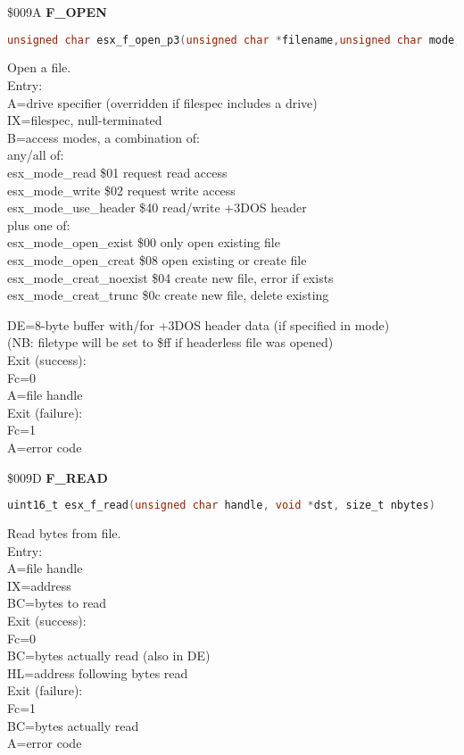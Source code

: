 \$009A \textbf{F\_OPEN}

\begin{lstlisting}[language=C]
unsigned char esx_f_open_p3(unsigned char *filename,unsigned char mode,struct esx_p3_hdr *h)
\end{lstlisting}

Open a file.\\
Entry:\\
A=drive specifier (overridden if filespec includes a drive)\\
IX=filespec, null-terminated\\
B=access modes, a combination of:\\
any/all of:\\
esx\_mode\_read \$01 request read access\\
esx\_mode\_write \$02 request write access\\
esx\_mode\_use\_header \$40 read/write +3DOS header\\
plus one of:\\
esx\_mode\_open\_exist \$00 only open existing file\\
esx\_mode\_open\_creat \$08 open existing or create file\\
esx\_mode\_creat\_noexist \$04 create new file, error if exists\\
esx\_mode\_creat\_trunc \$0c create new file, delete existing

DE=8-byte buffer with/for +3DOS header data (if specified in mode)\\
(NB: filetype will be set to \$ff if headerless file was opened)\\
Exit (success):\\
Fc=0\\
A=file handle\\
Exit (failure):\\
Fc=1\\
A=error code

\$009D \textbf{F\_READ}

\begin{lstlisting}[language=C]
uint16_t esx_f_read(unsigned char handle, void *dst, size_t nbytes)
\end{lstlisting}

Read bytes from file.\\
Entry:\\
A=file handle\\
IX=address\\
BC=bytes to read\\
Exit (success):\\
Fc=0\\
BC=bytes actually read (also in DE)\\
HL=address following bytes read\\
Exit (failure):\\
Fc=1\\
BC=bytes actually read\\
A=error code

